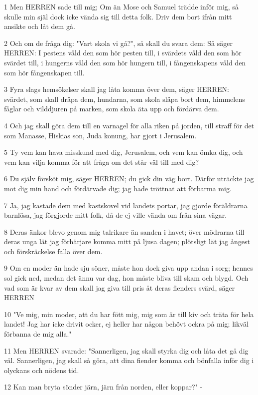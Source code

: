 \par 1 Men HERREN sade till mig; Om än Mose och Samuel trädde inför mig, så skulle min själ dock icke vända sig till detta folk. Driv dem bort ifrån mitt ansikte och låt dem gå.
\par 2 Och om de fråga dig: "Vart skola vi gå?", så skall du svara dem: Så säger HERREN: I pestens våld den som hör pesten till, i svärdets våld den som hör svärdet till, i hungerns våld den som hör hungern till, i fångenskapens våld den som hör fångenskapen till.
\par 3 Fyra slags hemsökelser skall jag låta komma över dem, säger HERREN: svärdet, som skall dräpa dem, hundarna, som skola släpa bort dem, himmelens fåglar och vilddjuren på marken, som skola äta upp och fördärva dem.
\par 4 Och jag skall göra dem till en varnagel för alla riken på jorden, till straff för det som Manasse, Hiskias son, Juda konung, har gjort i Jerusalem.
\par 5 Ty vem kan hava misskund med dig, Jerusalem, och vem kan ömka dig, och vem kan vilja komma för att fråga om det står väl till med dig?
\par 6 Du själv försköt mig, säger HERREN; du gick din väg bort. Därför uträckte jag mot dig min hand och fördärvade dig; jag hade tröttnat att förbarma mig.
\par 7 Ja, jag kastade dem med kastskovel vid landets portar, jag gjorde föräldrarna barnlösa, jag förgjorde mitt folk, då de ej ville vända om från sina vägar.
\par 8 Deras änkor blevo genom mig talrikare än sanden i havet; över mödrarna till deras unga lät jag förhärjare komma mitt på ljusa dagen; plötsligt lät jag ångest och förskräckelse falla över dem.
\par 9 Om en moder än hade sju söner, måste hon dock giva upp andan i sorg; hennes sol gick ned, medan det ännu var dag, hon måste bliva till skam och blygd. Och vad som är kvar av dem skall jag giva till pris åt deras fienders svärd, säger HERREN
\par 10 "Ve mig, min moder, att du har fött mig, mig som är till kiv och träta för hela landet! Jag har icke drivit ocker, ej heller har någon behövt ockra på mig; likväl förbanna de mig alla."
\par 11 Men HERREN svarade: "Sannerligen, jag skall styrka dig och låta det gå dig väl. Sannerligen, jag skall så göra, att dina fiender komma och bönfalla inför dig i olyckans och nödens tid.
\par 12 Kan man bryta sönder järn, järn från norden, eller koppar?" -
